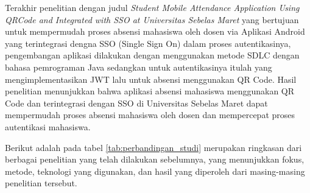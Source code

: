 Terakhir penelitian \cite{2018/11} dengan judul \textit{Student Mobile Attendance Application Using QRCode and Integrated with SSO at Universitas Sebelas Maret} yang bertujuan untuk mempermudah proses absensi mahasiswa oleh dosen via Aplikasi Android yang terintegrasi dengna SSO (Single Sign On) dalam proses autentikasinya, pengembangan aplikasi dilakukan dengan menggunakan metode SDLC dengan bahasa pemrograman Java sedangkan untuk autentikasinya itulah yang mengimplementasikan JWT lalu untuk absensi menggunakan QR Code. Hasil penelitian menunjukkan bahwa aplikasi absensi mahasiswa menggunakan QR Code dan terintegrasi dengan SSO di Universitas Sebelas Maret dapat mempermudah proses absensi mahasiswa oleh dosen dan mempercepat proses autentikasi mahasiswa.

Berikut adalah pada tabel \ref{tab:perbandingan_studi} merupakan ringkasan dari berbagai penelitian yang telah dilakukan sebelumnya, yang menunjukkan fokus, metode, teknologi yang digunakan, dan hasil yang diperoleh dari masing-masing penelitian tersebut.

